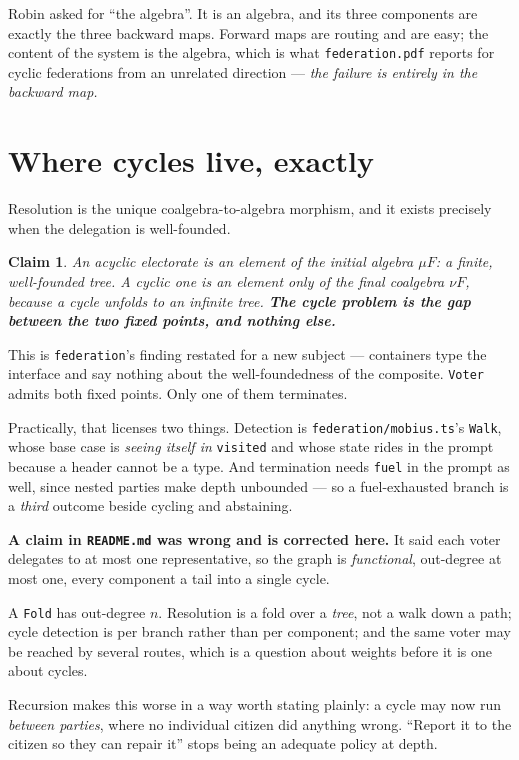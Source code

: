 \documentclass[11pt,a4paper]{article}
\newtheorem*{claim}{Claim}
\begin{document}
\begin{sectionbox}
Robin asked for ``the algebra''. It is an algebra, and its three components are
exactly the three backward maps. Forward maps are routing and are easy; the
content of the system is the algebra, which is what \texttt{federation.pdf}
reports for cyclic federations from an unrelated direction --- \emph{the failure
is entirely in the backward map.}
\end{sectionbox}

\section{Where cycles live, exactly}

Resolution is the unique coalgebra-to-algebra morphism, and it exists precisely
when the delegation is well-founded.

\begin{claim}
An acyclic electorate is an element of the initial algebra $\mu F$: a finite,
well-founded tree. A cyclic one is an element only of the final coalgebra $\nu
F$, because a cycle unfolds to an infinite tree. \textbf{The cycle problem is the
gap between the two fixed points, and nothing else.}
\end{claim}

This is \texttt{federation}'s finding restated for a new subject --- containers
type the interface and say nothing about the well-foundedness of the composite.
\texttt{Voter} admits both fixed points. Only one of them terminates.

Practically, that licenses two things. Detection is \texttt{federation/mobius.ts}'s
\texttt{Walk}, whose base case is \emph{seeing itself in} \texttt{visited} and
whose state rides in the prompt because a header cannot be a type. And
termination needs \texttt{fuel} in the prompt as well, since nested parties make
depth unbounded --- so a fuel-exhausted branch is a \emph{third} outcome beside
cycling and abstaining.

\begin{alarmbox}
\textbf{A claim in \texttt{README.md} was wrong and is corrected here.} It said
each voter delegates to at most one representative, so the graph is
\emph{functional}, out-degree at most one, every component a tail into a single
cycle.

A \texttt{Fold} has out-degree $n$. Resolution is a fold over a \emph{tree}, not
a walk down a path; cycle detection is per branch rather than per component; and
the same voter may be reached by several routes, which is a question about
weights before it is one about cycles.

Recursion makes this worse in a way worth stating plainly: a cycle may now run
\emph{between parties}, where no individual citizen did anything wrong. ``Report
it to the citizen so they can repair it'' stops being an adequate policy at
depth.
\end{alarmbox}
\end{document}

